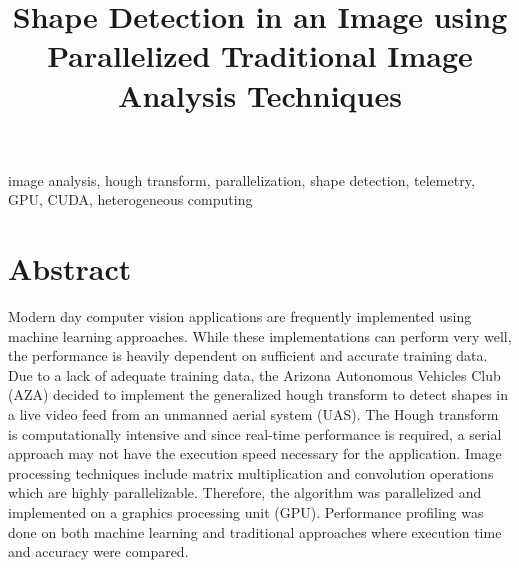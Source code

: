 \documentclass[conference]{IEEEtran}
\begin{document}
\title{Shape Detection in an Image using Parallelized Traditional Image Analysis Techniques\\
}

\author{
}

\maketitle


\begin{IEEEkeywords}
image analysis, hough transform, parallelization, shape detection, telemetry, GPU, CUDA, heterogeneous computing
\end{IEEEkeywords}

\section*{Abstract}
Modern day computer vision applications are frequently implemented using machine learning approaches.
While these implementations can perform very well, the performance is heavily dependent on sufficient and accurate training data.
Due to a lack of adequate training data, the Arizona Autonomous Vehicles Club (AZA) decided to implement the generalized hough transform to detect shapes in a live video feed from an unmanned aerial system (UAS).
The Hough transform is computationally intensive and since real-time performance is required, a serial approach may not have the execution speed necessary for the application.
Image processing techniques include matrix multiplication and convolution operations which are highly parallelizable.
Therefore, the algorithm was parallelized and implemented on a graphics processing unit (GPU).
Performance profiling was done on both machine learning and traditional approaches where execution time and accuracy were compared.
\end{document}
